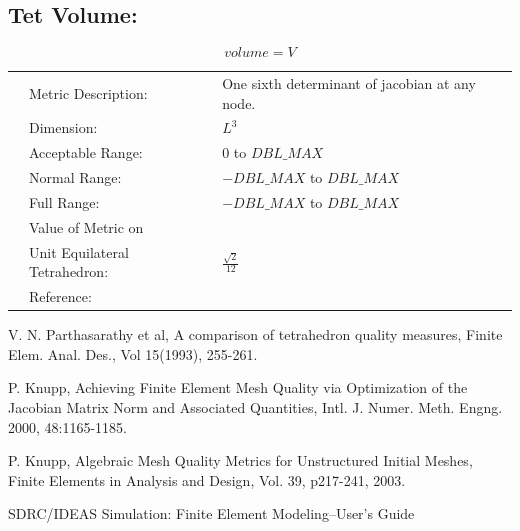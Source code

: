 \documentclass[12pt]{article}
\begin{document}
\subsection*{Tet Volume:}

\begin{displaymath}
volume = V 
\end{displaymath}

\begin{tabular}{lll}
& Metric Description:  & One sixth determinant of jacobian at any node. \\ 
& Dimension:           & $L^3$                   \\ 
& Acceptable Range:    & 0 to $DBL\_MAX$ \\ 
& Normal Range:        & $-DBL\_MAX$ to $DBL\_MAX$   \\ 
& Full Range:          & $-DBL\_MAX$ to $DBL\_MAX$   \\ 
& Value of Metric on   &  \\
& Unit Equilateral Tetrahedron:    & $\frac { \sqrt{2}} {12} $ \\
& Reference:           & \cite{one} \\
\end{tabular} 

\begin{thebibliography}{99}

  V. N. Parthasarathy et al, A comparison of tetrahedron quality 
measures, Finite Elem. Anal. Des., Vol 15(1993), 255-261.

 P. Knupp, Achieving Finite Element Mesh Quality via 
Optimization of the Jacobian Matrix Norm and Associated Quantities,
Intl. J. Numer. Meth. Engng. 2000, 48:1165-1185.

 P. Knupp, Algebraic Mesh Quality Metrics for Unstructured 
Initial Meshes, Finite Elements in Analysis and Design, Vol. 39, p217-241,
2003.

 SDRC/IDEAS Simulation: Finite Element Modeling--User's Guide

\end{thebibliography}
\end{document}
